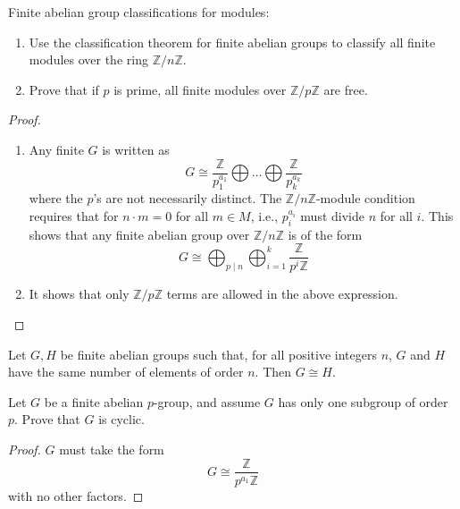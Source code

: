\documentclass[openany]{book}
\newcommand{\Z}{\mathbb{Z}}
\begin{document}
\begin{prob} 
    Finite abelian group classifications for modules:
\begin{enumerate}
    \item Use the classification theorem for finite abelian groups to classify all finite modules over the ring \( \mathbb{Z}/n\mathbb{Z} \).
    \item Prove that if \( p \) is prime, all finite modules over \( \mathbb{Z}/p\mathbb{Z} \) are free.
\end{enumerate}
\end{prob}
\begin{proof}
    \begin{enumerate}
        \item Any finite $G$ is written as 
        \begin{equation*}
            G\cong\frac{\Z}{p_1^{a_1}}\bigoplus\dots\bigoplus\frac{\Z}{p_k^{a_k}}
        \end{equation*}
        where the $p$'s are not necessarily distinct. The $\Z/n\Z$-module condition requires that for $n\cdot m=0$ for all $m\in M$, i.e., $p_i^{a_i}$ must divide $n$ for all $i$. This shows that any finite abelian group over $\Z/n\Z$ is of the form
        \begin{equation*}
            G\cong\bigoplus_{p\mid n}\bigoplus_{i=1}^k\frac{\Z}{p^i\Z}
        \end{equation*}
        \item It shows that only $\Z/p\Z$ terms are allowed in the above expression.
    \end{enumerate}
\end{proof}

\begin{prop}
Let \( G, H \) be finite abelian groups such that, for all positive integers \( n \), \( G \) and \( H \) have the same number of elements of order \( n \). Then $G\cong H$.
\end{prop}


\begin{prob}
Let \( G \) be a finite abelian \( p \)-group, and assume \( G \) has only one subgroup of order \( p \). Prove that \( G \) is cyclic.
\end{prob}
\begin{proof}
    $G$ must take the form
    \begin{equation*}
        G\cong \frac{\Z}{p^{a_1}\Z}
    \end{equation*}
    with no other factors.
\end{proof}
\end{document}
